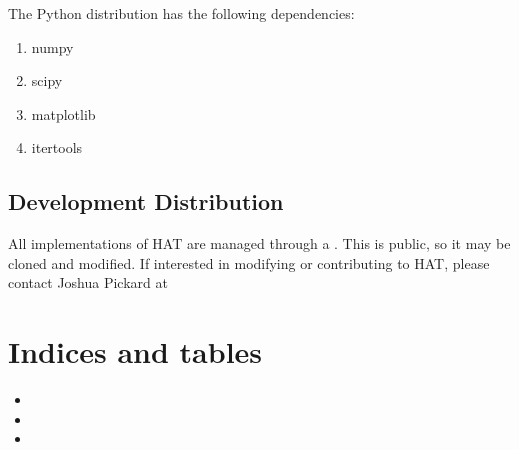 \documentclass[letterpaper,10pt,english]{sphinxmanual}
\begin{document}
\sphinxAtStartPar
The Python distribution has the following dependencies:
\begin{enumerate}
%
\item {} 
\sphinxAtStartPar
numpy

\item {} 
\sphinxAtStartPar
scipy

\item {} 
\sphinxAtStartPar
matplotlib

\item {} 
\sphinxAtStartPar
itertools

\end{enumerate}


\section{Development Distribution}
\label{\detokenize{index:development-distribution}}
\sphinxAtStartPar
All implementations of HAT are managed through a . This is public, so it may be
cloned and modified. If interested in modifying or contributing to HAT, please contact Joshua Pickard at 


\chapter{Indices and tables}
\label{\detokenize{index:indices-and-tables}}\begin{itemize}
\item {} 
\sphinxAtStartPar
{}

\item {} 
\sphinxAtStartPar
{}

\item {} 
\sphinxAtStartPar
{}

\end{itemize}


\renewcommand{\indexname}{Python Module Index}
\begin{sphinxtheindex}
\let\bigletter\sphinxstyleindexlettergroup
\bigletter{h}
\item\relax{}
\item\relax{}
\item\relax{}
\item\relax{}
\end{sphinxtheindex}

\renewcommand{\indexname}{Index}
\printindex
\end{document}
